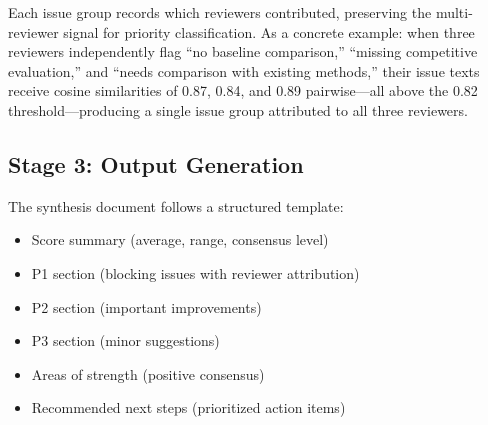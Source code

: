 Each issue group records which reviewers contributed, preserving the multi-reviewer signal for priority classification. As a concrete example: when three reviewers independently flag ``no baseline comparison,'' ``missing competitive evaluation,'' and ``needs comparison with existing methods,'' their issue texts receive cosine similarities of 0.87, 0.84, and 0.89 pairwise---all above the 0.82 threshold---producing a single issue group attributed to all three reviewers.

\subsection{Stage 3: Output Generation}

The synthesis document follows a structured template:
\begin{itemize}
    \item Score summary (average, range, consensus level)
    \item P1 section (blocking issues with reviewer attribution)
    \item P2 section (important improvements)
    \item P3 section (minor suggestions)
    \item Areas of strength (positive consensus)
    \item Recommended next steps (prioritized action items)
\end{itemize}
